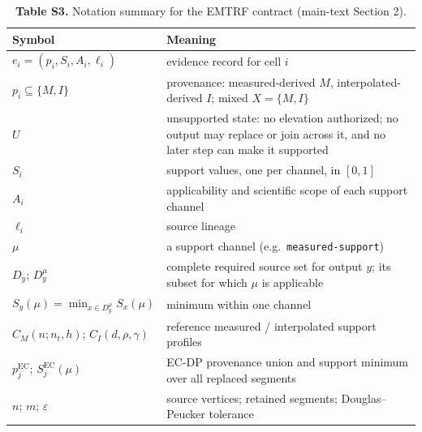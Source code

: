 \documentclass[11pt]{article}
\begin{document}
\begin{table}[!htbp]
\centering
\caption*{\textbf{Table S3.} Notation summary for the EMTRF contract (main-text Section 2).}
\vspace{2mm}
\small
\setlength{\tabcolsep}{4pt}
\begin{tabularx}{\linewidth}{@{}lX@{}}
\toprule
Symbol & Meaning \\
\midrule
$e_i=(p_i,S_i,A_i,\ell_i)$ & evidence record for cell $i$ \\
$p_i\subseteq\{M,I\}$ & provenance: measured-derived $M$, interpolated-derived $I$; mixed $X=\{M,I\}$ \\
$U$ & unsupported state: no elevation authorized; no output may replace or join across it, and no later step can make it supported \\
$S_i$ & support values, one per channel, in $[0,1]$ \\
$A_i$ & applicability and scientific scope of each support channel \\
$\ell_i$ & source lineage \\
$\mu$ & a support channel (e.g.\ \texttt{measured-support}) \\
$D_y$; $D_y^{\mu}$ & complete required source set for output $y$; its subset for which $\mu$ is applicable \\
$S_y(\mu)=\min_{x\in D_y^{\mu}}S_x(\mu)$ & minimum within one channel \\
$C_M(n;n_t,h)$; $C_I(d,\rho,\gamma)$ & reference measured / interpolated support profiles \\
$p_j^{\mathrm{EC}}$; $S_j^{\mathrm{EC}}(\mu)$ & EC-DP provenance union and support minimum over all replaced segments \\
$n$; $m$; $\varepsilon$ & source vertices; retained segments; Douglas--Peucker tolerance \\
\bottomrule
\end{tabularx}
\end{table}

\vspace{6mm}
\end{document}
